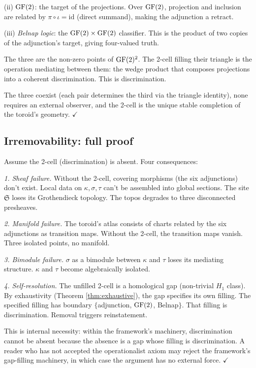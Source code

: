 (ii) \emph{$\operatorname{GF}(2)$}: the target of the projections. Over
$\operatorname{GF}(2)$, projection and inclusion are related by
$\pi \circ \iota = \mathrm{id}$ (direct summand), making
the adjunction a retract.

(iii) \emph{Belnap logic}: the $\operatorname{GF}(2) \times \operatorname{GF}(2)$
classifier. This is the product of two copies of the
adjunction's target, giving four-valued truth.

The three are the non-zero points of $\operatorname{GF}(2)^2$. The
2-cell filling their triangle is the operation mediating
between them: the wedge product that composes projections
into a coherent discrimination. This is discrimination.

The three coexist (each pair determines the third via the
triangle identity), none requires an external observer,
and the 2-cell is the unique stable completion of the
toroid's geometry. $\checkmark$

\subsection{Irremovability: full proof}
\label{app:irremovable-full}

Assume the 2-cell (discrimination) is absent. Four
consequences:

\emph{1. Sheaf failure.} Without the 2-cell, covering
morphisms (the six adjunctions) don't exist. Local data
on $\kappa, \sigma, \tau$ can't be assembled into global
sections. The site $\mathfrak{S}$ loses its Grothendieck
topology. The topos degrades to three disconnected
presheaves.

\emph{2. Manifold failure.} The toroid's atlas consists of
charts related by the six adjunctions as transition maps.
Without the 2-cell, the transition maps vanish. Three
isolated points, no manifold.

\emph{3. Bimodule failure.} $\sigma$ as a bimodule between
$\kappa$ and $\tau$ loses its mediating structure.
$\kappa$ and $\tau$ become algebraically isolated.

\emph{4. Self-resolution.} The unfilled 2-cell is a
homological gap (non-trivial $H_1$ class). By
exhaustivity (Theorem \ref{thm:exhaustive}), the gap
specifies its own filling. The specified filling has
boundary $\{$adjunction, $\operatorname{GF}(2)$, Belnap$\}$. That
filling is discrimination. Removal triggers reinstatement.

This is internal necessity: within the framework's
machinery, discrimination cannot be absent because
the absence is a gap whose filling is discrimination.
A reader who has not accepted the operationalist axiom
may reject the framework's gap-filling machinery, in
which case the argument has no external force.
$\checkmark$

